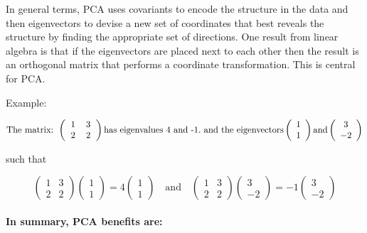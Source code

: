 \documentclass[11pt, oneside]{article}   	%
\begin{document}
In general terms, PCA uses covariants to encode the structure in the data and then eigenvectors to devise a new set of coordinates that best reveals the structure by finding the appropriate set of directions. One result from linear algebra is that if the eigenvectors are placed next to each other then the result is an orthogonal matrix that performs a coordinate transformation. This is central for PCA.

Example: 

\[ \text{The matrix: }
%
   \left(
      \begin{tabular}{cc}
      1 & 3 \\ 
      2 & 2
      \end{tabular}
   \right)
   \text{has eigenvalues 4 and -1.}
   \text{ and the eigenvectors}
   \left( \begin{array}{c}
      1 \\ 
      1
      \end{array}
   \right)
   \text{and} 
   \left( \begin{array}{c}
      3 \\ 
      -2
      \end{array}
   \right)
\]


such that

\[ \left( \begin{array}{cc}
      1 & 3\\ 
      2 & 2
      \end{array} \right)
%
   \left( \begin{array}{c}
      1 \\ 
      1
      \end{array} \right)
%
   = 4
   \left( \begin{array}{c}
   1\\
   1
   \end{array} \right)
\text{~~~and~~~}
   \left( \begin{array}{cc}
   1 & 3\\
   2 & 2
   \end{array} \right)
%
   \left( \begin{array}{c}
   3\\
   -2
   \end{array} \right)
%
   =-1
   \left( \begin{array}{c}
   3\\
   -2
   \end{array} \right)
\]



\paragraph{In summary, PCA benefits are:}
\end{document}
